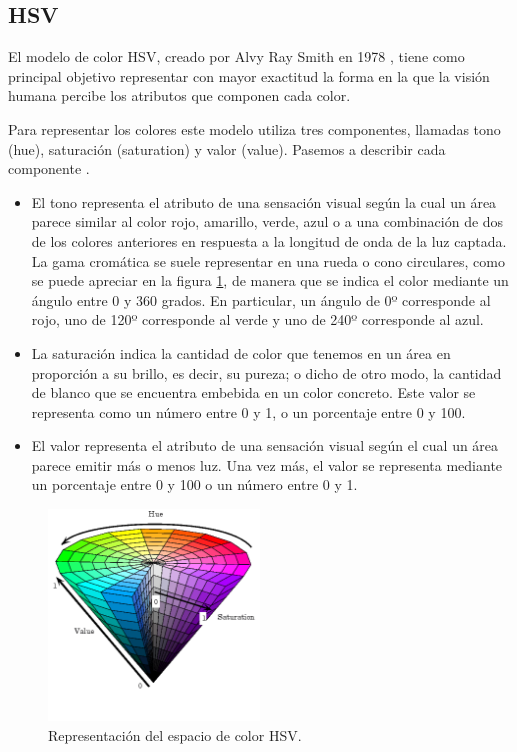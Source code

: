 \subsection{HSV}

El modelo de color HSV, creado por Alvy Ray Smith en 1978 \cite{abitofallcolorspaces}, tiene como principal objetivo representar con mayor exactitud la forma en la que la visión humana percibe los atributos que componen cada color.

Para representar los colores este modelo utiliza tres componentes, llamadas tono (hue), saturación (saturation) y valor (value). Pasemos a describir cada componente \cite{libroTID}.
\begin{itemize}
    \item El tono representa el atributo de una sensación visual según la cual un área parece similar al color rojo, amarillo, verde, azul o a una combinación de dos de los colores anteriores en respuesta a la longitud de onda de la luz captada. La gama cromática se suele representar en una rueda o cono circulares, como se puede apreciar en la figura \ref{fig:conoHSV}, de manera que se indica el color mediante un ángulo entre 0 y 360 grados. En particular, un ángulo de 0º corresponde al rojo, uno de 120º corresponde al verde y uno de 240º corresponde al azul.
    \item La saturación indica la cantidad de color que tenemos en un área en proporción a su brillo, es decir, su pureza; o dicho de otro modo, la cantidad de blanco que se encuentra embebida en un color concreto. Este valor se representa como un número entre 0 y 1, o un porcentaje entre 0 y 100.
    \item El valor representa el atributo de una sensación visual según el cual un área parece emitir más o menos luz. Una vez más, el valor se representa mediante un porcentaje entre 0 y 100 o un número entre 0 y 1.
\end{itemize}

\begin{figure}[h!]
    \centering
    \includegraphics[width=0.5\textwidth,height=0.5\textheight,keepaspectratio]{imagenes/parte_BS/cono_hsv.png}    
    \caption{Representación del espacio de color HSV.}
    \label{fig:conoHSV}
\end{figure}

